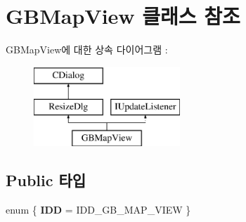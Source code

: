 \hypertarget{class_g_b_map_view}{}\section{G\+B\+Map\+View 클래스 참조}
\label{class_g_b_map_view}
G\+B\+Map\+View에 대한 상속 다이어그램 \+: \begin{figure}[H]
\begin{center}
\leavevmode
\includegraphics[height=3.000000cm]{class_g_b_map_view}
\end{center}
\end{figure}
\subsection*{Public 타입}
\begin{DoxyCompactItemize}
\item 
\mbox{\label{class_g_b_map_view_a7888981cacff337e7de3a48be4a69e95}} 
enum \{ {\bfseries I\+DD} = I\+D\+D\+\_\+\+G\+B\+\_\+\+M\+A\+P\+\_\+\+V\+I\+EW
 \}
\end{DoxyCompactItemize}
